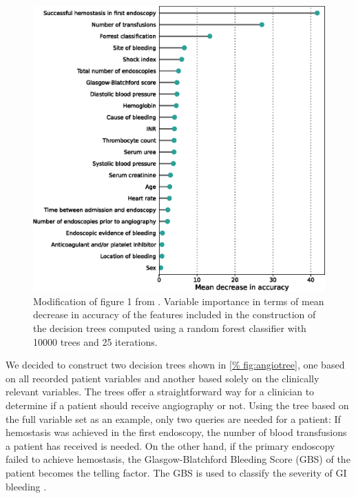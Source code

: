 \begin{figure}[b!]
\centering
\includegraphics[width=\textwidth]{04_GraphicFiles/03_angio_forest.eps}
\caption{Modification of figure 1 from \citet{Werner2021}. Variable importance
  in terms of mean decrease in accuracy of the features included in the   
  construction of the decision trees computed using a random forest
  classifier with \num{10000} trees and \num{25} iterations.}
\label{fig:angioforest}
\end{figure}

\noindent We decided to construct two decision trees shown in \cref{%
fig:angiotree}, one based on all recorded patient variables and another based
solely on the clinically relevant variables. The trees offer a straightforward
way for a clinician to determine if a patient should receive angiography or
not. Using the tree based on the full variable set as an example, only two
queries are needed for a patient: If hemostasis was achieved in the first
endoscopy, the number of blood transfusions a patient has received is needed.
On the other hand, if the primary endoscopy failed to achieve hemostasis, the
Glasgow-Blatchford Bleeding Score (GBS) of the patient becomes the telling
factor. The GBS is used to classify the severity of GI bleeding \citep{%
Laursen2015}.

